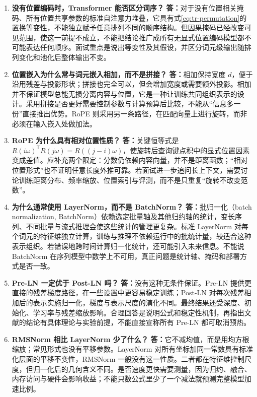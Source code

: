 \documentclass[UTF8,12pt,a4paper,fontset=fandol]{ctexart}
\begin{document}
\begin{enumerate}[resume*=trquestions]
\item \textbf{没有位置编码时，Transformer 能否区分词序？}
\textbf{答：}对于没有位置相关掩码、所有位置共享参数的标准自注意力堆叠，它具有式\eqref{eq:tr-permutation}的置换等变性，不能独立赋予任意排列不同的顺序结构。但因果掩码已经改变可见范围，使这一前提不成立，不能把结论推广成所有无显式位置编码模型都不可能表达任何顺序。面试重点是说出等变性及其假设，并区分词元级输出随排列变化和池化后整体输出不变。

\item \textbf{位置嵌入为什么常与词元嵌入相加，而不是拼接？}
\textbf{答：}相加保持宽度 $d$，便于沿用残差与投影形状；拼接也完全可以，但会增加宽度或需要额外投影。相加并不保证模型总能无损分离内容与位置，它是一种让训练共同组织表示的设计。采用拼接是否更好需要控制参数与计算预算后比较，不能从“信息多一份”直接推出优势。RoPE 则采用另一条路径，在匹配向量上进行旋转，而非必须在输入嵌入处做加法。

\item \textbf{RoPE 为什么具有相对位置性质？}
\textbf{答：}关键恒等式是 $R(i\omega)^{\mathsf T}R(j\omega)=R((j-i)\omega)$，使旋转后查询键点积中的显式位置因素变成差值。应补充两个限定：分数仍依赖内容向量，并不是距离函数；“相对位置形式”也不证明任意长度外推可靠。若面试进一步追问长上下文，需要讨论训练距离分布、频率缩放、位置索引与评测，而不是只重复“旋转不改变范数”。

\item \textbf{为什么通常使用 LayerNorm，而不是 BatchNorm？}
\textbf{答：}批归一化（batch normalization, BatchNorm）依赖选定批量轴及其他归约轴的统计，变长序列、不同批量与流式推理会使这些统计的管理更复杂。标准 LayerNorm 对每个词元的特征维独立计算，训练与推理不依赖运行中的批统计量，较适合这种表示组织。若错误地跨时间计算归一化统计，还可能引入未来信息。不能说 BatchNorm 在序列模型中数学上不可用，真正问题是统计轴、掩码和部署方式是否一致。

\item \textbf{Pre-LN 一定优于 Post-LN 吗？}
\textbf{答：}没有这种无条件保证。Pre-LN 提供更直接的残差梯度路径，在一些设置中更容易稳定训练；Post-LN 对每次残差相加后的表示实施归一化，梯度与表示尺度的演化不同。最终结果还受深度、初始化、学习率与残差缩放影响。合理回答是说明公式和稳定性机制，再指出文献\cite{xiong2020}的结论有具体理论与实验前提，不能直接宣称所有 Pre-LN 都可取消预热。

\item \textbf{RMSNorm 相比 LayerNorm 少了什么？}
\textbf{答：}它不减均值，而是用均方根缩放；常见形式也没有平移参数。LayerNorm 对所有坐标加同一常数具有标准化层面的平移不变性，RMSNorm 一般没有这一性质。二者都在特征维控制尺度，但归一化后的几何含义不同。是否速度更快需要测量，因为归约、融合、内存访问与硬件会影响收益；不能只数公式里少了一个减法就预测完整模型加速比例。


\end{enumerate}
\end{document}
